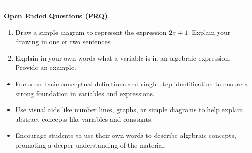 \documentclass[10pt]{article}
\begin{document}
\vspace{-0.2cm}
\hrule
\vspace{0.2cm}
\textbf{\small Open Ended Questions (FRQ)}
\begin{enumerate}[label=\textbf{Q\arabic*.}, start=9, itemsep=5pt, topsep=0pt]

  \item \small Draw a simple diagram to represent the expression $2x + 1$. Explain your drawing in one or two sentences. \vspace{1.6cm}

  \item \small Explain in your own words what a variable is in an algebraic expression. Provide an example. \vspace{1.6cm}

\end{enumerate}

\vfill

\begin{tcolorbox}[colback=blue!5, colframe=mainblue!50, title=\small \textbf{Chef's Tips}, fonttitle=\bfseries, bottom=1mm]
\begin{itemize}[noitemsep, topsep=2pt, leftmargin=0.5cm]
  \item \scriptsize Focus on basic conceptual definitions and single-step identification to ensure a strong foundation in variables and expressions.\item \scriptsize Use visual aids like number lines, graphs, or simple diagrams to help explain abstract concepts like variables and constants.\item \scriptsize Encourage students to use their own words to describe algebraic concepts, promoting a deeper understanding of the material.
\end{itemize}
\end{tcolorbox}
\end{document}
